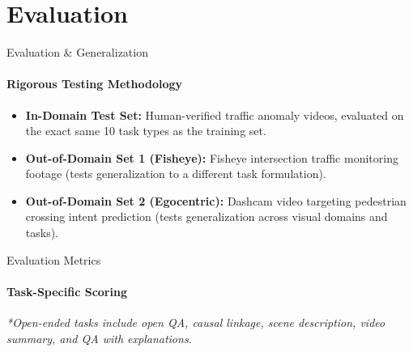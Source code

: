 \documentclass[aspectratio=169]{beamer}
\begin{document}
\section{Evaluation}
\begin{frame}{Evaluation \& Generalization}
    \framesubtitle{Rigorous Testing Methodology}
    \begin{itemize}
        \item \textbf{In-Domain Test Set:} Human-verified traffic anomaly videos, evaluated on the exact same 10 task types as the training set.
        \item \textbf{Out-of-Domain Set 1 (Fisheye):} Fisheye intersection traffic monitoring footage (tests generalization to a different task formulation).
        \item \textbf{Out-of-Domain Set 2 (Egocentric):} Dashcam video targeting pedestrian crossing intent prediction (tests generalization across visual domains and tasks).
    \end{itemize}
\end{frame}
\begin{frame}{Evaluation Metrics}
    \framesubtitle{Task-Specific Scoring}
    \begin{table}[]
        \centering
    \end{table}
    \vspace{0.3cm}
    \textit{*Open-ended tasks include open QA, causal linkage, scene description, video summary, and QA with explanations.}
\end{frame}
\end{document}

